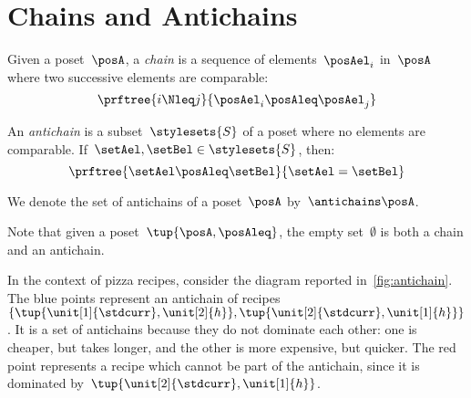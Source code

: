 

\section{Chains and Antichains}
\label{sec:chains-antichains}

\begin{definition}
  \label{def:chain}
  Given a poset~$\posA$, a \emph{chain} is a sequence of elements~${\posAel_i}$ in~$\posA$ where two successive elements are comparable:
  \begin{equation}
    \prftree{i \Nleq j }{\posAel_i \posAleq \posAel_j}
  \end{equation}
\end{definition}


\begin{definition}
  \label{def:antichain}
  An \emph{antichain} is a subset~$\stylesets{S}$ of a poset where no elements are comparable.
  If~$\setAel,\setBel \in \stylesets{S}$, then:
  \begin{equation}
    \prftree{\setAel \posAleq \setBel}{\setAel=\setBel}
\end{equation}
\end{definition}

We denote the set of antichains of a poset~$\posA$ by~$\antichains\posA$.

\begin{remark}
  Note that given a poset~$\tup{\posA,\posAleq}$, the empty set~$\emptyset$ is both a chain and an antichain.
\end{remark}

In the context of pizza recipes, consider the diagram reported in~\cref{fig:antichain}.
The blue points represent an antichain of recipes~$\{\tup{\unit[1]{\stdcurr},\unit[2]{h}},\tup{\unit[2]{\stdcurr},\unit[1]{h}}\}$.
It is a set of antichains because they do not dominate each other: one is cheaper, but takes longer, and the other is more expensive, but quicker.
The red point represents a recipe which cannot be part of the antichain, since it is dominated by~$\tup{\unit[2]{\stdcurr},\unit[1]{h}}$.

